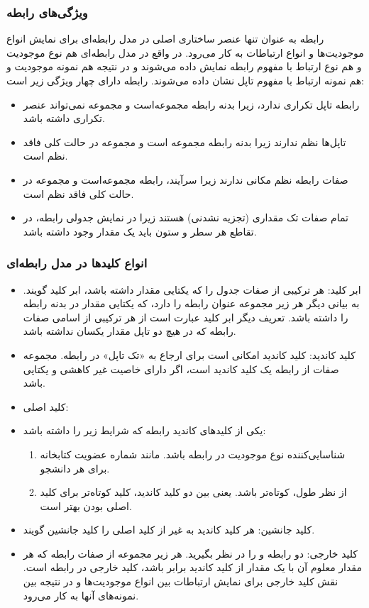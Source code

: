 {\subsubsection{ویژگی‌های رابطه}
رابطه به عنوان تنها عنصر ساختاری اصلی در مدل رابطه‌ای برای نمایش انواع موجودیت‌ها و انواع ارتباطات به کار می‌رود. در واقع در مدل رابطه‌ای هم نوع موجودیت و هم نوع ارتباط با مفهوم رابطه نمایش داده می‌شوند و در نتیجه هم نمونه موجودیت و هم نمونه ارتباط با مفهوم تاپل نشان داده می‌شوند. رابطه دارای چهار ویژگی زیر است:
\begin{itemize}
  	\item رابطه تاپل تکراری ندارد، زیرا بدنه رابطه مجموعه‌است و مجموعه نمی‌تواند عنصر تکراری داشته باشد.
	\item تاپل‌ها نظم ندارند زیرا بدنه رابطه مجموعه‌ است و مجموعه در حالت کلی فاقد نظم است.
	\item صفات رابطه نظم مکانی ندارند زیرا سرآیند، رابطه مجموعه‌است و مجموعه در حالت کلی فاقد نظم است.
	\item تمام صفات تک مقداری (تجزیه نشدنی) هستند زیرا در نمایش جدولی رابطه، در تقاطع هر سطر و ستون باید یک مقدار وجود داشته باشد.
\end{itemize}

 
\subsubsection{انواع کلیدها در مدل رابطه‌ای}

\begin{itemize}
  	\item ابر کلید: هر ترکیبی از صفات جدول را که یکتایی مقدار داشته باشد، ابر کلید گویند. به بیانی دیگر هر زیر مجموعه عنوان رابطه را دارد، که یکتایی مقدار در بدنه رابطه را داشته باشد. تعریف دیگر ابر کلید عبارت است از هر ترکیبی از اسامی صفات رابطه که در هیچ دو تاپل مقدار یکسان نداشته باشد.

  	\item کلید کاندید: کلید کاندید امکانی است برای ارجاع به «تک تاپل» در رابطه. مجموعه صفات  از رابطه یک کلید کاندید است، اگر دارای خاصیت غیر کاهشی و یکتایی باشد.

  	\item کلید اصلی: 
  	\item یکی از کلیدهای کاندید رابطه که شرایط زیر را داشته باشد:
	\begin{enumerate}
		\item شناسایی‌کننده نوع موجودیت در رابطه باشد. مانند شماره عضویت کتابخانه برای هر دانشجو.
		\item از نظر طول، کوتاه‌تر باشد. یعنی بین دو کلید کاندید، کلید کوتاه‌تر برای کلید اصلی بودن بهتر است.
	\end{enumerate}
  	\item کلید جانشین: هر کلید کاندید به غیر از کلید اصلی را کلید جانشین گویند.
  	\item کلید خارجی: دو رابطه  و  را در نظر بگیرید. هر زیر مجموعه از صفات رابطه که هر مقدار معلوم آن با یک مقدار از کلید کاندید برابر باشد، کلید خارجی در رابطه است. نقش کلید خارجی برای نمایش ارتباطات بین انواع موجودیت‌ها و در نتیجه بین نمونه‌های آنها به کار می‌رود.


\end{itemize}}
